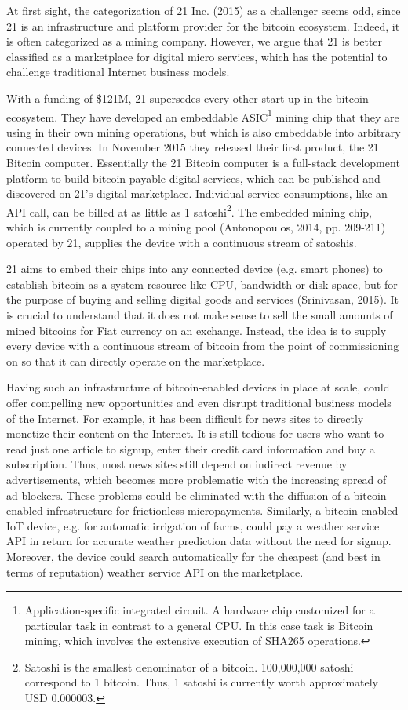 At first sight, the categorization of 21 Inc. (2015) as a challenger seems odd, 
since 21 is an infrastructure and platform provider for the bitcoin ecosystem. 
Indeed, it is often categorized as a mining company. However, we argue that 21 
is better classified as a marketplace for digital micro services, which has the 
potential to challenge traditional Internet business models.

With a funding of \$121M, 21 supersedes every other start up in the bitcoin ecosystem. 
They have developed an embeddable ASIC\footnote{ Application-specific integrated 
circuit. A hardware chip customized for a particular task in contrast to a general 
CPU. In this case task is Bitcoin mining, which involves the extensive execution 
of SHA265 operations.} mining chip that they are using in their own mining operations, 
but which is also embeddable into arbitrary connected devices. In November 2015 
they released their first product, the 21 Bitcoin computer. Essentially the 21 
Bitcoin computer is a full-stack development platform to build bitcoin-payable 
digital services, which can be published and discovered on 21's digital marketplace. 
Individual service consumptions, like an API call, can be billed at as little as 
1 satoshi\footnote{ Satoshi is the smallest denominator of a bitcoin. 100,000,000 
satoshi correspond to 1 bitcoin. Thus, 1 satoshi is currently worth approximately 
USD 0.000003.}. The embedded mining chip, which is currently coupled to a mining 
pool (Antonopoulos, 2014, pp. 209-211) operated by 21, supplies the device with 
a continuous stream of satoshis.

21 aims to embed their chips into any connected device (e.g. smart phones) to establish 
bitcoin as a system resource like CPU, bandwidth or disk space, but for the purpose 
of buying and selling digital goods and services (Srinivasan, 2015). It is crucial 
to understand that it does not make sense to sell the small amounts of mined bitcoins 
for Fiat currency on an exchange. Instead, the idea is to supply every device with 
a continuous stream of bitcoin from the point of commissioning on so that it can 
directly operate on the marketplace. 

Having such an infrastructure of bitcoin-enabled devices in place at scale, could 
offer compelling new opportunities and even disrupt traditional business models 
of the Internet. For example, it has been difficult for news sites to directly 
monetize their content on the Internet. It is still tedious for users who want 
to read just one article to signup, enter their credit card information and buy 
a subscription. Thus, most news sites still depend on indirect revenue by advertisements, 
which becomes more problematic with the increasing spread of ad-blockers. These 
problems could be eliminated with the diffusion of a bitcoin-enabled infrastructure 
for frictionless micropayments. Similarly, a bitcoin-enabled IoT device, e.g. for 
automatic irrigation of farms, could pay a weather service API in return for accurate 
weather prediction data without the need for signup. Moreover, the device could 
search automatically for the cheapest (and best in terms of reputation) weather 
service API on the marketplace.

